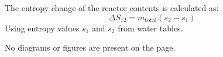 The entropy change of the reactor contents is calculated as:  
\[
\Delta S_{12} = m_{\text{total}} (s_2 - s_1)
\]  
Using entropy values \( s_1 \) and \( s_2 \) from water tables.  

No diagrams or figures are present on the page.